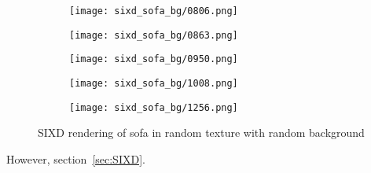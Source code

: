 \begin{figure}[h!]
\begin{subfigure}[b]{0.32\linewidth}
  \end{subfigure}
  \begin{subfigure}[b]{0.32\linewidth}
    \texttt{[image: sixd\_sofa\_bg/0806.png]}
  \end{subfigure}
  \begin{subfigure}[b]{0.32\linewidth}
    \texttt{[image: sixd\_sofa\_bg/0863.png]}
  \end{subfigure}
  \begin{subfigure}[b]{0.32\linewidth}
    \texttt{[image: sixd\_sofa\_bg/0950.png]}
  \end{subfigure}
  \begin{subfigure}[b]{0.32\linewidth}
    \texttt{[image: sixd\_sofa\_bg/1008.png]}
  \end{subfigure}
  \begin{subfigure}[b]{0.32\linewidth}
    \texttt{[image: sixd\_sofa\_bg/1256.png]}
  \end{subfigure}
  \caption{SIXD rendering of sofa in random texture with random background}
  \label{fig:sixd_sofa_bg}
\end{figure}

However, section~\vref{sec:SIXD}.

